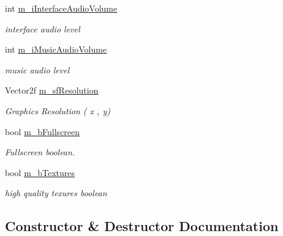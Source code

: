 \begin{DoxyCompactItemize}
\hypertarget{class_profile_a4d785b3d9bd75173abfa6f8b98d72f70}{}\label{class_profile_a4d785b3d9bd75173abfa6f8b98d72f70} 
int \hyperlink{class_profile_a4d785b3d9bd75173abfa6f8b98d72f70}{m\+\_\+i\+Interface\+Audio\+Volume}
\begin{DoxyCompactList}\small\item\em interface audio level \end{DoxyCompactList}\item 
\hypertarget{class_profile_ad539b144e98e879f6759a9082ad8f17c}{}\label{class_profile_ad539b144e98e879f6759a9082ad8f17c} 
int \hyperlink{class_profile_ad539b144e98e879f6759a9082ad8f17c}{m\+\_\+i\+Music\+Audio\+Volume}
\begin{DoxyCompactList}\small\item\em music audio level \end{DoxyCompactList}\item 
\hypertarget{class_profile_a32263f8c1a2c9d2158450774601f77b8}{}\label{class_profile_a32263f8c1a2c9d2158450774601f77b8} 
Vector2f \hyperlink{class_profile_a32263f8c1a2c9d2158450774601f77b8}{m\+\_\+sf\+Resolution}
\begin{DoxyCompactList}\small\item\em Graphics Resolution ( x , y) \end{DoxyCompactList}\item 
\hypertarget{class_profile_a46c194b7ca443a11e74c413b7f4795bd}{}\label{class_profile_a46c194b7ca443a11e74c413b7f4795bd} 
bool \hyperlink{class_profile_a46c194b7ca443a11e74c413b7f4795bd}{m\+\_\+b\+Fullscreen}
\begin{DoxyCompactList}\small\item\em Fullscreen boolean. \end{DoxyCompactList}\item 
\hypertarget{class_profile_abe8d5282ca1966bf2985bf4d79bef78f}{}\label{class_profile_abe8d5282ca1966bf2985bf4d79bef78f} 
bool \hyperlink{class_profile_abe8d5282ca1966bf2985bf4d79bef78f}{m\+\_\+b\+Textures}
\begin{DoxyCompactList}\small\item\em high quality texures boolean \end{DoxyCompactList}\end{DoxyCompactItemize}


\subsection{Constructor \& Destructor Documentation}
\hypertarget{class_profile_a4eea708cdbed0262d9e7ddbe3f1e3f89}{}\label{class_profile_a4eea708cdbed0262d9e7ddbe3f1e3f89} 
